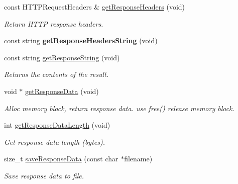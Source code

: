 \begin{DoxyCompactItemize}
\mbox{\label{classHTTPRequest_a820be5765bae9fffdeb0f2643a025b40}} 
const H\+T\+T\+P\+Request\+Headers \& \hyperlink{classHTTPRequest_a820be5765bae9fffdeb0f2643a025b40}{get\+Response\+Headers} (void)
\begin{DoxyCompactList}\small\item\em Return H\+T\+TP response headers. \end{DoxyCompactList}\item 
\mbox{\label{classHTTPRequest_a609283f6a797e6c6d4f7a655fef4d073}} 
const string {\bfseries get\+Response\+Headers\+String} (void)
\item 
\mbox{\label{classHTTPRequest_af1a031e0f79d9cac28b899b58c388b01}} 
const string \hyperlink{classHTTPRequest_af1a031e0f79d9cac28b899b58c388b01}{get\+Response\+String} (void)
\begin{DoxyCompactList}\small\item\em Returns the contents of the result. \end{DoxyCompactList}\item 
\mbox{\label{classHTTPRequest_afbcf501584a659c8eb78c878c1f8b406}} 
void $\ast$ \hyperlink{classHTTPRequest_afbcf501584a659c8eb78c878c1f8b406}{get\+Response\+Data} (void)
\begin{DoxyCompactList}\small\item\em Alloc memory block, return response data. use free() release memory block. \end{DoxyCompactList}\item 
\mbox{\label{classHTTPRequest_a8b2b610418aae5a8e31afe7814864f1a}} 
int \hyperlink{classHTTPRequest_a8b2b610418aae5a8e31afe7814864f1a}{get\+Response\+Data\+Length} (void)
\begin{DoxyCompactList}\small\item\em Get response data length (bytes). \end{DoxyCompactList}\item 
\mbox{\label{classHTTPRequest_a1dce74d188f379996cd791a8a10b846d}} 
size\+\_\+t \hyperlink{classHTTPRequest_a1dce74d188f379996cd791a8a10b846d}{save\+Response\+Data} (const char $\ast$filename)
\begin{DoxyCompactList}\small\item\em Save response data to file. \end{DoxyCompactList}\item 

\end{DoxyCompactItemize}
